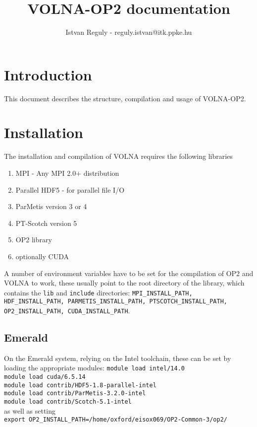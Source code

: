 \documentclass[11pt]{article}
\begin{document}
\title{VOLNA-OP2 documentation}
\author{Istvan Reguly - reguly.istvan@itk.ppke.hu}
\maketitle
\section{Introduction}
This document describes the structure, compilation and usage of VOLNA-OP2.

\section{Installation}
The installation and compilation of VOLNA requires the following libraries
\begin{enumerate}
\item MPI - Any MPI 2.0+ distribution
\item Parallel HDF5 - for parallel file I/O
\item ParMetis version 3 or 4
\item PT-Scotch version 5
\item OP2 library
\item optionally CUDA
\end{enumerate}
A number of environment variables have to be set for the compilation of OP2 and VOLNA to work, these usually point to the root directory of the library, which contains the \texttt{lib} and \texttt{include} directories: \texttt{MPI\_INSTALL\_PATH, HDF\_INSTALL\_PATH, PARMETIS\_INSTALL\_PATH, PTSCOTCH\_INSTALL\_PATH, \\ OP2\_INSTALL\_PATH, CUDA\_INSTALL\_PATH}.

\subsection{Emerald}
On the Emerald system, relying on the Intel toolchain, these can be set by loading the appropriate modules:
\texttt{module load intel/14.0}\\
\texttt{module load cuda/6.5.14}\\
\texttt{module load contrib/HDF5-1.8-parallel-intel}\\
\texttt{module load contrib/ParMetis-3.2.0-intel}\\
\texttt{module load contrib/Scotch-5.1-intel}\\
as well as setting \\ \texttt{export OP2\_INSTALL\_PATH=/home/oxford/eisox069/OP2-Common-3/op2/}
\end{document}
